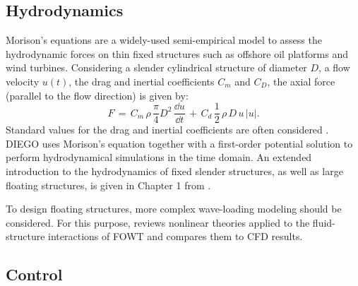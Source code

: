 

\subsection{Hydrodynamics}

Morison's equations are a widely-used semi-empirical model to assess the hydrodynamic forces on thin fixed structures such as offshore oil platforms and wind turbines. 
Considering a slender cylindrical structure of diameter $D$, a flow velocity $u(t)$, the drag and inertial coefficients $C_m$ and $C_D$, the axial force (parallel to the flow direction) is given by:   
\begin{equation}
    F\,=\,C_{m}\,\rho \,{\frac {\pi }{4}}D^{2}\,{\frac{\dd u}{\dd t}}\,+\,C_{d}\,{\frac 12}\,\rho \,D\,u\,|u|.
\end{equation}
Standard values for the drag and inertial coefficients are often considered \citep{dnv_2013_offshore_design}. 
DIEGO uses Morison's equation together with a first-order potential solution to perform hydrodynamical simulations in the time domain.
An extended introduction to the hydrodynamics of fixed slender structures, as well as large floating structures, is given in Chapter 1 from \citep{milano_thesis_2021}.  

To design floating structures, more complex wave-loading modeling should be considered. 
For this purpose, \citet{ronge_2023_hydrodynamics_fowt} reviews nonlinear theories applied to the fluid-structure interactions of FOWT and compares them to CFD results. 


\subsection{Control}

